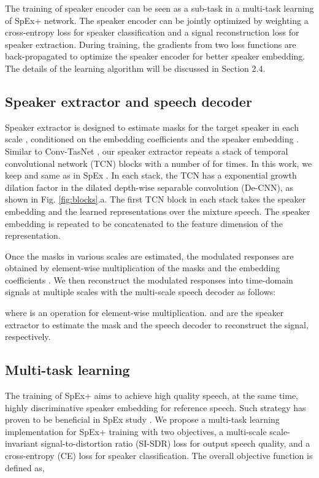 \documentclass[a4paper]{article}
\begin{document}
The training of speaker encoder can be seen as a sub-task in a multi-task learning \cite{spex2020} of SpEx+ network. The speaker encoder can be jointly optimized by weighting a cross-entropy loss for speaker classification and a signal reconstruction loss \cite{wu2019time} for speaker extraction. During training, the gradients from two loss functions are back-propagated to optimize the speaker encoder for better speaker embedding. The details of the learning algorithm will be discussed in Section 2.4.


\subsection{Speaker extractor and speech decoder}

Speaker extractor is designed to estimate masks  for the target speaker in each scale , conditioned on the embedding coefficients  and the speaker embedding . Similar to Conv-TasNet \cite{luo2019conv}, our speaker extractor repeats a stack of temporal convolutional network (TCN) blocks with a number of  for  times. In this work, we keep  and  same as in SpEx \cite{spex2020}. In each stack, the TCN has a exponential growth dilation factor  in the dilated depth-wise separable convolution (De-CNN), as shown in Fig. \ref{fig:blocks}.a. The first TCN block in each stack takes the speaker embedding  and the learned representations over the mixture speech. The speaker embedding  is repeated to be concatenated to the feature dimension of the representation. 

Once the masks  in various scales are estimated, the modulated responses  are obtained by element-wise multiplication of the masks  and the embedding coefficients . We then reconstruct the modulated responses  into time-domain signals  at multiple scales with the multi-scale speech decoder as follows:

where  is an operation for element-wise multiplication.  and  are the speaker extractor to estimate the mask and the speech decoder to reconstruct the signal, respectively.

\subsection{Multi-task learning}

The training of SpEx+ aims to achieve high quality speech, at the same time, highly discriminative speaker embedding for reference speech. Such strategy has proven to be beneficial in SpEx study \cite{spex2020}. We propose a multi-task learning implementation for SpEx+ training with two objectives, a multi-scale scale-invariant signal-to-distortion ratio (SI-SDR) loss for output speech quality, and a cross-entropy (CE) loss for speaker classification. The overall objective function is defined as,
\end{document}
